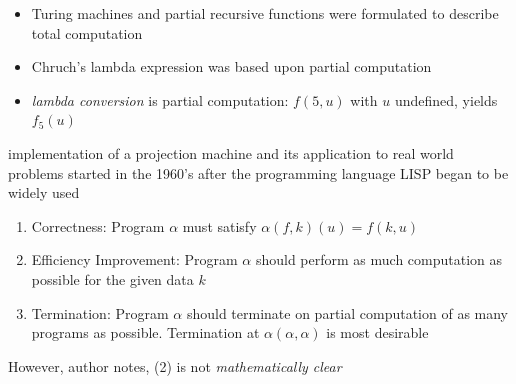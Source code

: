 \documentclass[aspectratio=169,dvipsnames]{beamer}
\begin{document}
\begin{frame}
    \begin{itemize}
        \item Turing machines and partial recursive functions were formulated to describe total computation
        \item Chruch's lambda expression was based upon partial computation
        \item \emph{lambda conversion} is partial computation: $f(5,u)$ with $u$ undefined, yields $f_5(u)$
    \end{itemize}
\end{frame}


\begin{frame}
    implementation of a projection machine and its application to real world
    problems started in the 1960's after the programming language LISP
    began to be widely used
   
\end{frame}


\begin{frame}
    \begin{enumerate}
        \item Correctness: 
            Program $\alpha$ must satisfy $\alpha(f,k)(u)=f(k,u)$
        \item Efficiency Improvement: 
            Program $\alpha$ should perform as much computation as possible
            for the given data $k$
        \item Termination:
            Program $\alpha$ should terminate on partial computation of as 
            many programs as possible. Termination at $\alpha(\alpha,\alpha)$ 
            is most desirable
    \end{enumerate}

However, author notes, (2) is not \textit{mathematically clear}

\end{frame}
\end{document}
